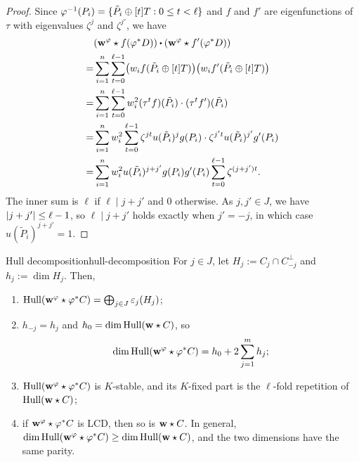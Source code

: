 \documentclass[twocolumn, 11pt]{scrartcl}
\begin{document}
\begin{proof}
    Since $\varphi^{-1}(P_i)=\{\tilde P_i\oplus[t]T:0\leq t<\ell\}$ and $f$ and $f'$ are eigenfunctions of $\tau$ with eigenvalues $\zeta^j$ and $\zeta^{j'}$, we have
    \begin{align*}
        &\pa*{\bfw^\varphi\star f(\varphi^*D)}\dotpr\pa*{\bfw^\varphi\star f'(\varphi^*D)} \\
        =&\sum_{i=1}^n \sum_{t=0}^{\ell-1} \pa*{w_i f(\tilde P_i\oplus[t] T)}\pa*{w_i f'(\tilde P_i\oplus[t] T)} \\
        =&\sum_{i=1}^n \sum_{t=0}^{\ell-1} w_i^2 (\tau^t f)(\tilde P_i)\cdot(\tau^t f')(\tilde P_i) \\
        =&\sum_{i=1}^n w_i^2 \sum_{t=0}^{\ell-1} \zeta^{jt} u(\tilde P_i)^j g(P_i)\cdot\zeta^{j't} u(\tilde P_i)^{j'} g'(P_i) \\
        =&\sum_{i=1}^n w_i^2 u(\tilde P_i)^{j+j'} g(P_i) g'(P_i) \sum_{t=0}^{\ell-1} \zeta^{(j+j')t}.
    \end{align*}
    The inner sum is $\ell$ if $\ell\mid j+j'$ and $0$ otherwise. As $j,j'\in J$, we have $\vert j+j'\vert\leq\ell-1$, so $\ell\mid j+j'$ holds exactly when $j'=-j$, in which case $u(\tilde P_i)^{j+j'}=1$.
\end{proof}

\begin{theorem}{Hull decomposition}{hull-decomposition}
    For $j\in J$, let $H_j:=C_j\cap C_{-j}^\perp$ and $h_j:=\dim H_j$. Then,
    \begin{enumerate}
        \item \label{enum:hd-decomp} $\operatorname{Hull}(\mathbf{w}^\varphi\star \varphi^*C)=\bigoplus_{j\in J}\varepsilon_j(H_j)$;
        \item \label{enum:hd-dim} $h_{-j}=h_j$ and $h_0=\dim\operatorname{Hull}(\mathbf{w}\star C)$, so
        \[ \dim\operatorname{Hull}(\mathbf{w}^\varphi\star \varphi^*C)=h_0+2\sum_{j=1}^{m}h_j; \]
        \item \label{enum:hd-qc} $\operatorname{Hull}(\mathbf{w}^\varphi\star \varphi^*C)$ is $K$-stable, and its $K$-fixed part is the $\ell$-fold repetition of $\operatorname{Hull}(\mathbf{w}\star C)$;
        \item \label{enum:hd-lcd} if $\mathbf{w}^\varphi\star \varphi^*C$ is LCD, then so is $\mathbf{w}\star C$. In general, $\dim\operatorname{Hull}(\mathbf{w}^\varphi\star \varphi^*C)\geq\dim\operatorname{Hull}(\mathbf{w}\star C)$, and the two dimensions have the same parity.
    \end{enumerate}
\end{theorem}
\end{document}
